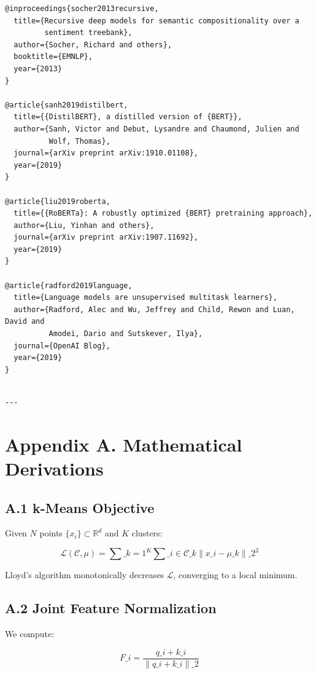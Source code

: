 \begin{lstlisting}
@inproceedings{socher2013recursive,
  title={Recursive deep models for semantic compositionality over a 
         sentiment treebank},
  author={Socher, Richard and others},
  booktitle={EMNLP},
  year={2013}
}

@article{sanh2019distilbert,
  title={{DistilBERT}, a distilled version of {BERT}},
  author={Sanh, Victor and Debut, Lysandre and Chaumond, Julien and 
          Wolf, Thomas},
  journal={arXiv preprint arXiv:1910.01108},
  year={2019}
}

@article{liu2019roberta,
  title={{RoBERTa}: A robustly optimized {BERT} pretraining approach},
  author={Liu, Yinhan and others},
  journal={arXiv preprint arXiv:1907.11692},
  year={2019}
}

@article{radford2019language,
  title={Language models are unsupervised multitask learners},
  author={Radford, Alec and Wu, Jeffrey and Child, Rewon and Luan, David and 
          Amodei, Dario and Sutskever, Ilya},
  journal={OpenAI Blog},
  year={2019}
}
\end{lstlisting}
\begin{lstlisting}

---
\end{lstlisting}


\section{Appendix A. Mathematical Derivations}

\subsection{A.1 k-Means Objective}

Given $N$ points $\{x_i\} \subset \mathbb{R}^d$ and $K$ clusters:

\[
\mathcal{L}(\mathcal{C}, \mu) = \sum\_{k=1}^{K} \sum\_{i \in \mathcal{C}\_k} \|x\_i - \mu\_k\|\_2^2
\tag{A.1}
\]

Lloyd's algorithm monotonically decreases $\mathcal{L}$, converging to a 
local minimum.

\subsection{A.2 Joint Feature Normalization}

We compute:

\[
F\_i = \frac{q\_i + k\_i}{\|q\_i + k\_i\|\_2}
\tag{A.2}
\]

